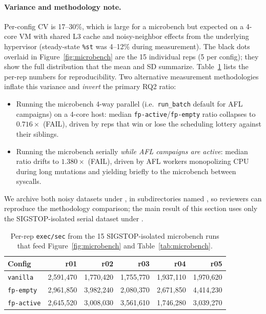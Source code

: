 \documentclass[11pt]{article}
\begin{document}
\paragraph{Variance and methodology note.}
Per-config CV is 17--30\%, which is large for a microbench but
expected on a 4-core VM with shared L3 cache and noisy-neighbor
effects from the underlying hypervisor (steady-state \texttt{\%st}
was 4--12\% during measurement). The black dots overlaid in
Figure~\ref{fig:microbench} are the 15 individual reps (5 per
config); they show the full distribution that the mean and SD
summarize. Table~\ref{tab:microbench-individual} lists the
per-rep numbers for reproducibility. Two alternative measurement
methodologies inflate this variance and \emph{invert} the primary
RQ2 ratio:

\begin{itemize}
  \item Running the microbench 4-way parallel (i.e.~\texttt{run\_batch}
  default for AFL campaigns) on a 4-core host: median
  \texttt{fp-active}/\texttt{fp-empty} ratio collapses to
  $0.716\times$ (FAIL), driven by reps that win or lose the
  scheduling lottery against their siblings.
  \item Running the microbench serially \emph{while AFL campaigns
  are active}: median ratio drifts to $1.380\times$ (FAIL),
  driven by AFL workers monopolizing CPU during long mutations and
  yielding briefly to the microbench between syscalls.
\end{itemize}

We archive both noisy datasets under
, in subdirectories named
, so reviewers can reproduce the methodology
comparison; the main
result of this section uses only the SIGSTOP-isolated serial dataset
under .

\begin{table}[t]
  \centering
  \footnotesize
  \setlength{\tabcolsep}{8pt}
  \begin{tabular}{@{}lrrrrr@{}}
    \toprule
    Config & r01 & r02 & r03 & r04 & r05 \\
    \midrule
    \texttt{vanilla}   & 2{,}591{,}470 & 1{,}770{,}420 & 1{,}755{,}770 & 1{,}937{,}110 & 1{,}970{,}620 \\
    \texttt{fp-empty}  & 2{,}961{,}850 & 3{,}982{,}240 & 2{,}080{,}370 & 2{,}671{,}850 & 4{,}414{,}230 \\
    \texttt{fp-active} & 2{,}645{,}520 & 3{,}008{,}030 & 3{,}561{,}610 & 1{,}746{,}280 & 3{,}039{,}270 \\
    \bottomrule
  \end{tabular}
  \caption{Per-rep \texttt{exec/sec} from the 15 SIGSTOP-isolated
  microbench runs that feed Figure~\ref{fig:microbench} and
  Table~\ref{tab:microbench}.}
  \label{tab:microbench-individual}
\end{table}
\end{document}
